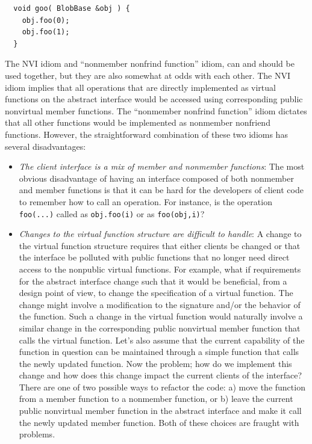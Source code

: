 \documentclass[pdf,ps2pdf,11pt]{SANDreport}
\begin{document}
{\small\begin{verbatim}
  void goo( BlobBase &obj ) {
    obj.foo(0);
    obj.foo(1);
  }
\end{verbatim}}

The NVI idiom and ``nonmember nonfrind function'' idiom, can and should be
used together, but they are also somewhat at odds with each other.  The NVI
idiom implies that all operations that are directly implemented as virtual
functions on the abstract interface would be accessed using corresponding
public nonvirtual member functions.  The ``nonmember nonfrind function'' idiom
dictates that all other functions would be implemented as nonmember nonfriend
functions.  However, the straightforward combination of these two idioms has
several disadvantages:

\begin{itemize}

{}\item\textit{The client interface is a mix of member and nonmember
functions}: The most obvious disadvantage of having an interface composed of
both nonmember and member functions is that it can be hard for the developers
of client code to remember how to call an operation.  For instance, is the
operation {}\texttt{foo(...)} called as {}\texttt{obj.foo(i)} or as
{}\texttt{foo(obj,i)}?

{}\item\textit{Changes to the virtual function structure are difficult to
handle}: A change to the virtual function structure requires that either
clients be changed or that the interface be polluted with public functions
that no longer need direct access to the nonpublic virtual functions.  For
example, what if requirements for the abstract interface change such that it
would be beneficial, from a design point of view, to change the specification
of a virtual function.  The change might involve a modification to the
signature and/or the behavior of the function.  Such a change in the virtual
function would naturally involve a similar change in the corresponding public
nonvirtual member function that calls the virtual function.  Let's also assume
that the current capability of the function in question can be maintained
through a simple function that calls the newly updated function.  Now the
problem; how do we implement this change and how does this change impact the
current clients of the interface?  There are one of two possible ways to
refactor the code: a) move the function from a member function to a nonmember
function, or b) leave the current public nonvirtual member function in the
abstract interface and make it call the newly updated member function.  Both
of these choices are fraught with problems.

\end{itemize}
\end{document}

